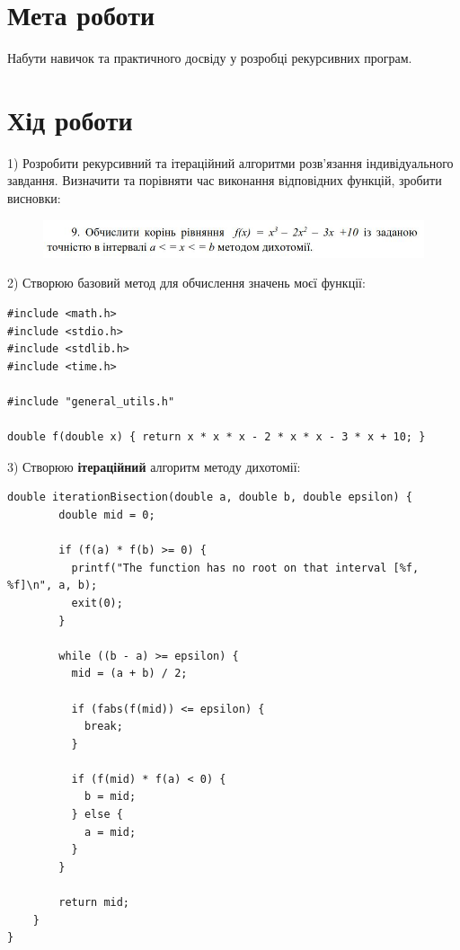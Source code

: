 \section{Мета роботи}
Набути навичок та практичного досвіду у розробці рекурсивних програм.

\section{Хід роботи}
1) Розробити рекурсивний та ітераційний алгоритми розв’язання індивідуального завдання. Визначити та порівняти час виконання відповідних функцій, зробити висновки:

\begin{figure}[h]
    \centering
    \includegraphics[width=16cm]{reports/algos/lab2/assets/1.png}
\end{figure}

2) Створюю базовий метод для обчислення значень моєї функції:

\begin{lstlisting}[style=customc]
#include <math.h>
#include <stdio.h>
#include <stdlib.h>
#include <time.h>

#include "general_utils.h"
    
double f(double x) { return x * x * x - 2 * x * x - 3 * x + 10; }
\end{lstlisting}

3) Створюю \textbf{ітераційний} алгоритм методу дихотомії:

\begin{lstlisting}[style=customc]
    double iterationBisection(double a, double b, double epsilon) {
        double mid = 0;
      
        if (f(a) * f(b) >= 0) {
          printf("The function has no root on that interval [%f, %f]\n", a, b);
          exit(0);
        }
      
        while ((b - a) >= epsilon) {
          mid = (a + b) / 2;
      
          if (fabs(f(mid)) <= epsilon) {
            break;
          }
      
          if (f(mid) * f(a) < 0) {
            b = mid;
          } else {
            a = mid;
          }
        }
      
        return mid;
    }
}
\end{lstlisting}


